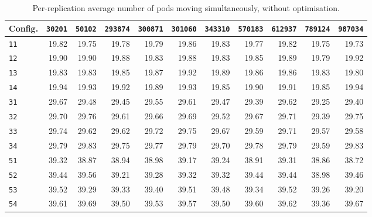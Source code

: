 \begin{table}[htb]
\centering
\small
\caption{Per-replication average number of pods moving simultaneously, without optimisation.}
\label{tab:app_pods_opt_false}
\begin{tabular}{@{}lrrrrrrrrrr@{}}
\toprule
\textbf{Config.} & \texttt{30201} & \texttt{50102} & \texttt{293874} & \texttt{300871} & \texttt{301060} & \texttt{343310} & \texttt{570183} & \texttt{612937} & \texttt{789124} & \texttt{987034} \\
\midrule
\texttt{11} & 19.82 & 19.75 & 19.78 & 19.79 & 19.86 & 19.83 & 19.77 & 19.82 & 19.75 & 19.73 \\
\texttt{12} & 19.90 & 19.90 & 19.88 & 19.83 & 19.88 & 19.83 & 19.85 & 19.89 & 19.79 & 19.92 \\
\texttt{13} & 19.83 & 19.83 & 19.85 & 19.87 & 19.92 & 19.89 & 19.86 & 19.86 & 19.83 & 19.80 \\
\texttt{14} & 19.94 & 19.93 & 19.92 & 19.89 & 19.93 & 19.85 & 19.90 & 19.91 & 19.85 & 19.94 \\
\texttt{31} & 29.67 & 29.48 & 29.45 & 29.55 & 29.61 & 29.47 & 29.39 & 29.62 & 29.25 & 29.40 \\
\texttt{32} & 29.70 & 29.76 & 29.61 & 29.66 & 29.69 & 29.52 & 29.67 & 29.71 & 29.39 & 29.75 \\
\texttt{33} & 29.74 & 29.62 & 29.62 & 29.72 & 29.75 & 29.67 & 29.59 & 29.71 & 29.57 & 29.58 \\
\texttt{34} & 29.79 & 29.83 & 29.75 & 29.77 & 29.79 & 29.70 & 29.78 & 29.79 & 29.59 & 29.83 \\
\texttt{51} & 39.32 & 38.87 & 38.94 & 38.98 & 39.17 & 39.24 & 38.91 & 39.31 & 38.86 & 38.72 \\
\texttt{52} & 39.44 & 39.56 & 39.21 & 39.28 & 39.32 & 39.32 & 39.44 & 39.44 & 38.98 & 39.46 \\
\texttt{53} & 39.52 & 39.29 & 39.33 & 39.40 & 39.51 & 39.48 & 39.34 & 39.52 & 39.26 & 39.20 \\
\texttt{54} & 39.61 & 39.69 & 39.50 & 39.53 & 39.57 & 39.50 & 39.60 & 39.62 & 39.36 & 39.67 \\
\bottomrule
\end{tabular}
\end{table}
